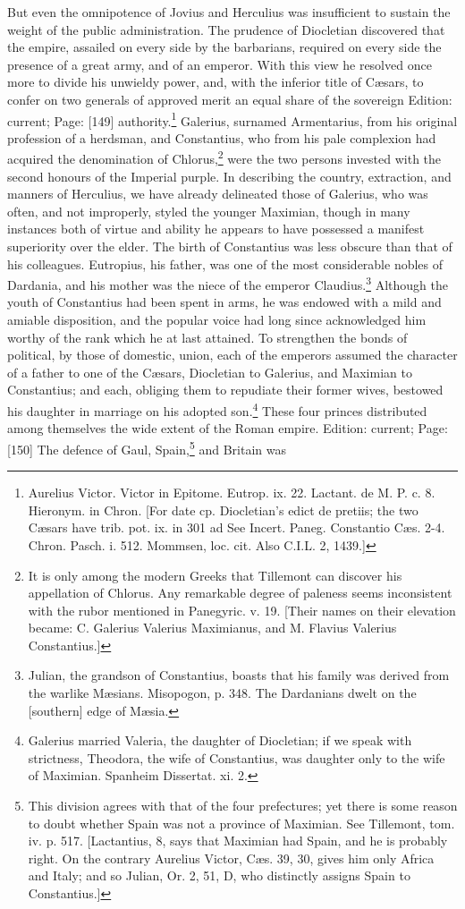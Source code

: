 But even the omnipotence of Jovius and Herculius was insufficient to sustain the weight of the public administration. The prudence of Diocletian discovered that the empire, assailed on every side by the barbarians, required on every side the presence of a great army, and of an emperor. With this view he resolved once more to divide his unwieldy power, and, with the inferior title of Cæsars, to confer on two generals of approved merit an equal share of the sovereign Edition: current; Page: [149] authority.\footnote{Aurelius Victor. Victor in Epitome. Eutrop. ix. 22. Lactant. de M. P. c. 8. Hieronym. in Chron. [For date cp. Diocletian\texthebrew{}’s edict de pretiis; the two Cæsars have trib. pot. ix. in 301 ad See Incert. Paneg. Constantio Cæs. 2-4. Chron. Pasch. i. 512. Mommsen, loc. cit. Also C.I.L. 2, 1439.]} Galerius, surnamed Armentarius, from his original profession of a herdsman, and Constantius, who from his pale complexion had acquired the denomination of Chlorus,\footnote{It is only among the modern Greeks that Tillemont can discover his appellation of Chlorus. Any remarkable degree of paleness seems inconsistent with the rubor mentioned in Panegyric. v. 19. [Their names on their elevation became: C. Galerius Valerius Maximianus, and M. Flavius Valerius Constantius.]} were the two persons invested with the second honours of the Imperial purple. In describing the country, extraction, and manners of Herculius, we have already delineated those of Galerius, who was often, and not improperly, styled the younger Maximian, though in many instances both of virtue and ability he appears to have possessed a manifest superiority over the elder. The birth of Constantius was less obscure than that of his colleagues. Eutropius, his father, was one of the most considerable nobles of Dardania, and his mother was the niece of the emperor Claudius.\footnote{Julian, the grandson of Constantius, boasts that his family was derived from the warlike Mæsians. Misopogon, p. 348. The Dardanians dwelt on the [southern] edge of Mæsia.} Although the youth of Constantius had been spent in arms, he was endowed with a mild and amiable disposition, and the popular voice had long since acknowledged him worthy of the rank which he at last attained. To strengthen the bonds of political, by those of domestic, union, each of the emperors assumed the character of a father to one of the Cæsars, Diocletian to Galerius, and Maximian to Constantius; and each, obliging them to repudiate their former wives, bestowed his daughter in marriage on his adopted son.\footnote{Galerius married Valeria, the daughter of Diocletian; if we speak with strictness, Theodora, the wife of Constantius, was daughter only to the wife of Maximian. Spanheim Dissertat. xi. 2.} These four princes distributed among themselves the wide extent of the Roman empire. Edition: current; Page: [150] The defence of Gaul, Spain,\footnote{This division agrees with that of the four prefectures; yet there is some reason to doubt whether Spain was not a province of Maximian. See Tillemont, tom. iv. p. 517. [Lactantius, 8, says that Maximian had Spain, and he is probably right. On the contrary Aurelius Victor, Cæs. 39, 30, gives him only Africa and Italy; and so Julian, Or. 2, 51, D, who distinctly assigns Spain to Constantius.]} and Britain was 